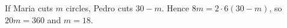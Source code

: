 If Maria cuts $m$ circles, Pedro cuts $30-m$. Hence $8m=2\cdot6(30-m)$, so $20m=360$ and $\boxed{m=18}$.
